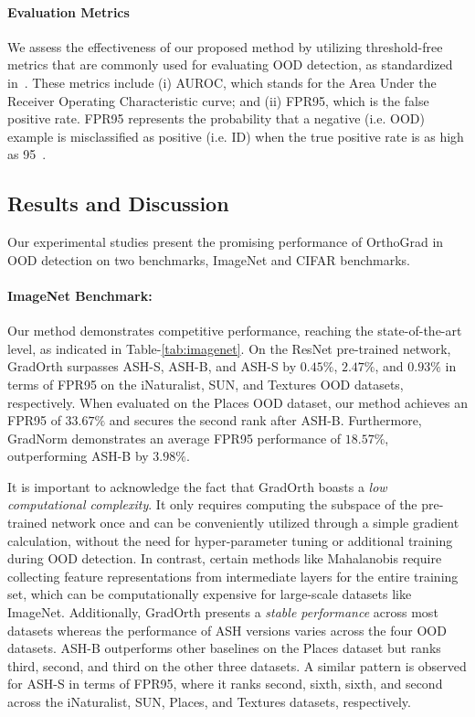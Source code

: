 \documentclass{article}
\begin{document}
\paragraph{Evaluation Metrics}
We assess the effectiveness of our proposed method by utilizing threshold-free metrics that are commonly used for evaluating OOD detection, as standardized in~\cite {hendrycks17baseline}. These metrics include (i) AUROC, which stands for the Area Under the Receiver Operating Characteristic curve; and (ii) FPR95, which is the false positive rate. FPR95 represents the probability that a negative (i.e. OOD) example is misclassified as positive (i.e. ID) when the true positive rate is as high as 95~\cite{Liang2017}.

\label{sec:benchmarks}

\subsection{Results and Discussion}\vspace{-0.2cm}
Our experimental studies present the promising performance of OrthoGrad in OOD detection on two benchmarks, ImageNet and CIFAR benchmarks.
\paragraph{ImageNet Benchmark:}  Our method demonstrates competitive performance, reaching the state-of-the-art level, as indicated in Table-\ref{tab:imagenet}.
On the ResNet pre-trained network, GradOrth surpasses ASH-S, ASH-B, and ASH-S by $0.45\%$, $2.47\%$, and $0.93\%$ in terms of FPR95 on the iNaturalist, SUN, and Textures OOD datasets, respectively. When evaluated on the Places OOD dataset, our method achieves an FPR95 of $33.67\%$ and secures the second rank after ASH-B. Furthermore, GradNorm demonstrates an average FPR95 performance of $18.57\%$, outperforming ASH-B by $3.98\%$.

It is important to acknowledge the fact that GradOrth boasts a \textit{low computational complexity}. It only requires computing the subspace of the pre-trained network once and can be conveniently utilized through a simple gradient calculation, without the need for hyper-parameter tuning or additional training during OOD detection. In contrast, certain methods like Mahalanobis \cite{lee2018simple} require collecting feature representations from intermediate layers for the entire training set, which can be computationally expensive for large-scale datasets like ImageNet. Additionally, GradOrth presents a \textit{stable performance} across most datasets whereas the performance of ASH versions varies across the four OOD datasets. ASH-B outperforms other baselines on the Places dataset but ranks third, second, and third on the other three datasets. A similar pattern is observed for ASH-S in terms of FPR95, where it ranks second, sixth, sixth, and second across the iNaturalist, SUN, Places, and Textures datasets, respectively.
\end{document}
